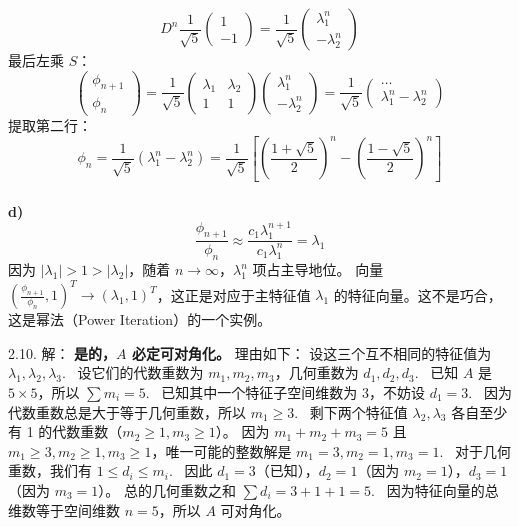 \begin{exer}
$$ D^n \frac{1}{\sqrt{5}} \begin{pmatrix} 1 \\ -1 \end{pmatrix} = \frac{1}{\sqrt{5}} \begin{pmatrix} \lambda_1^n \\ -\lambda_2^n \end{pmatrix} $$
最后左乘 $S$：
$$ \begin{pmatrix} \phi_{n+1} \\ \phi_n \end{pmatrix} = \frac{1}{\sqrt{5}} \begin{pmatrix} \lambda_1 & \lambda_2 \\ 1 & 1 \end{pmatrix} \begin{pmatrix} \lambda_1^n \\ -\lambda_2^n \end{pmatrix} = \frac{1}{\sqrt{5}} \begin{pmatrix} \dots \\ \lambda_1^n - \lambda_2^n \end{pmatrix} $$
提取第二行：
$$ \phi_n = \frac{1}{\sqrt{5}} (\lambda_1^n - \lambda_2^n) = \frac{1}{\sqrt{5}} \left[ \left(\frac{1+\sqrt{5}}{2}\right)^n - \left(\frac{1-\sqrt{5}}{2}\right)^n \right] $$
\\
\textbf{d)}
$$ \frac{\phi_{n+1}}{\phi_n} \approx \frac{c_1 \lambda_1^{n+1}}{c_1 \lambda_1^n} = \lambda_1 $$
因为 $|\lambda_1| > 1 > |\lambda_2|$，随着 $n \to \infty$，$\lambda_1^n$ 项占主导地位。
向量 $(\frac{\phi_{n+1}}{\phi_n}, 1)^T \to (\lambda_1, 1)^T$，这正是对应于主特征值 $\lambda_1$ 的特征向量。这不是巧合，这是幂法（Power Iteration）的一个实例。

2.10. 解：
\textbf{是的，$A$ 必定可对角化。}
理由如下：
设这三个互不相同的特征值为 $\lambda_1, \lambda_2, \lambda_3$.~
设它们的代数重数为 $m_1, m_2, m_3$，几何重数为 $d_1, d_2, d_3$.~
已知 $A$ 是 $5 \times 5$，所以 $\sum m_i = 5$.~
已知其中一个特征子空间维数为 3，不妨设 $d_1 = 3$.~
因为代数重数总是大于等于几何重数，所以 $m_1 \ge 3$.~
剩下两个特征值 $\lambda_2, \lambda_3$ 各自至少有 1 的代数重数（$m_2 \ge 1, m_3 \ge 1$）。
因为 $m_1 + m_2 + m_3 = 5$ 且 $m_1 \ge 3, m_2 \ge 1, m_3 \ge 1$，唯一可能的整数解是 $m_1 = 3, m_2 = 1, m_3 = 1$.~
对于几何重数，我们有 $1 \le d_i \le m_i$.~
因此 $d_1 = 3$（已知），$d_2 = 1$（因为 $m_2=1$），$d_3 = 1$（因为 $m_3=1$）。
总的几何重数之和 $\sum d_i = 3 + 1 + 1 = 5$.~
因为特征向量的总维数等于空间维数 $n=5$，所以 $A$ 可对角化。


\end{exer}
